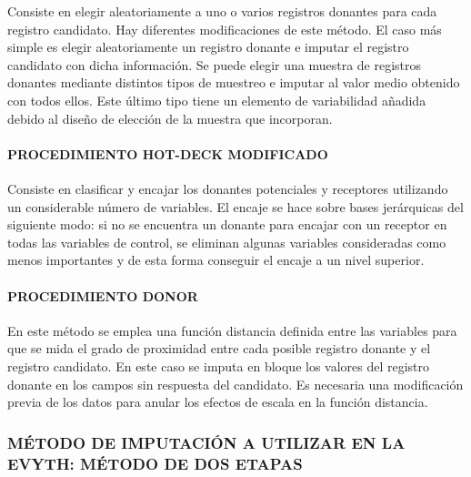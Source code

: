 \documentclass[
  openany]{book}
\begin{document}
Consiste en elegir aleatoriamente a uno o varios registros donantes para cada registro candidato. Hay diferentes modificaciones de este método. El caso más simple es elegir aleatoriamente un registro donante e imputar el registro candidato con dicha información. Se puede elegir una muestra de registros donantes mediante distintos tipos de muestreo e imputar al valor medio obtenido con todos ellos. Este último tipo tiene un elemento de variabilidad añadida debido al diseño de elección de la muestra que incorporan.

\hypertarget{procedimiento-hot-deck-modificado}{%
\paragraph{\texorpdfstring{\textbf{PROCEDIMIENTO HOT-DECK MODIFICADO}}{PROCEDIMIENTO HOT-DECK MODIFICADO}}\label{procedimiento-hot-deck-modificado}}

Consiste en clasificar y encajar los donantes potenciales y receptores utilizando un considerable número de variables. El encaje se hace sobre bases jerárquicas del siguiente modo: si no se encuentra un donante para encajar con un receptor en todas las variables de control, se eliminan algunas variables consideradas como menos importantes y de esta forma conseguir el encaje a un nivel superior.

\hypertarget{procedimiento-donor}{%
\paragraph{\texorpdfstring{\textbf{PROCEDIMIENTO DONOR}}{PROCEDIMIENTO DONOR}}\label{procedimiento-donor}}

En este método se emplea una función distancia definida entre las variables para que se mida el grado de proximidad entre cada posible registro donante y el registro candidato. En este caso se imputa en bloque los valores del registro donante en los campos sin respuesta del candidato. Es necesaria una modificación previa de los datos para anular los efectos de escala en la función distancia.

\hypertarget{muxe9todo-de-imputaciuxf3n-a-utilizar-en-la-evyth-muxe9todo-de-dos-etapas}{%
\subsubsection{\texorpdfstring{\textbf{MÉTODO DE IMPUTACIÓN A UTILIZAR EN LA EVYTH: MÉTODO DE DOS ETAPAS}}{MÉTODO DE IMPUTACIÓN A UTILIZAR EN LA EVYTH: MÉTODO DE DOS ETAPAS}}\label{muxe9todo-de-imputaciuxf3n-a-utilizar-en-la-evyth-muxe9todo-de-dos-etapas}}
\end{document}
